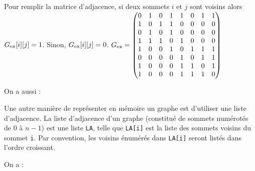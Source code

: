 
\ifprof
\begin{corrige}
Pour remplir la matrice d'adjacence, si deux sommets $i$ et $j$ sont voisins alors ${G}_{\text{ex}}[i][j] = 1$.
 Sinon,  ${G}_{\text{ex}}[i][j] = 0$. 
${G}_{\text{ex}}=
\begin{pmatrix}
0 	& 1	& 0	& 1	& 1	& 0	& 1	& 1	\\ 
1 	& 0	& 1	& 1	& 0	& 0	& 0	& 0	\\ 
0 	& 1	& 0	& 1	& 0	& 0	& 0	& 0	\\ 
1	& 1	& 1	& 0	& 1	& 0	& 0	& 0	\\ 
1 	& 0	& 0	& 1	& 0	& 1	& 1	& 1	\\ 
0 	& 0	& 0	& 0	& 1	& 0	& 1	& 1	\\ 
1 	& 0	& 0	& 0	& 1	& 1	& 0	& 1	\\ 
1 	& 0	& 0	& 0	& 1	& 1	& 1	& 0	\\ 
\end{pmatrix}$

On a aussi : 

\end{corrige}
\else
\fi

\ifprof
\else
Une autre manière de représenter en mémoire un graphe est d'utiliser une liste d'adjacence. La liste d'adjacence d'un graphe (constitué de sommets numérotés de 0 à $n-1$) est une liste \lstinline{LA}, telle que \lstinline{LA[i]} est la liste des sommets voisins du sommet \lstinline{i}. Par convention, les voisins énumérés dans \lstinline{LA[i]} seront listés dans l'ordre croissant.
\fi

\ifprof
\begin{corrige}
On a  :




\end{corrige}
\else
\fi

